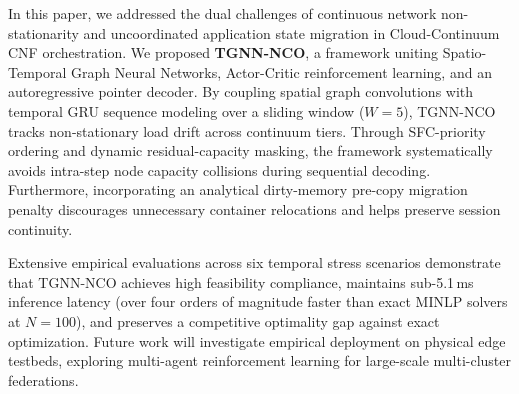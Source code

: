 \documentclass[conference]{IEEEtran}
\begin{document}
In this paper, we addressed the dual challenges of continuous network non-stationarity and uncoordinated application state migration in Cloud-Continuum CNF orchestration. We proposed \textbf{TGNN-NCO}, a framework uniting Spatio-Temporal Graph Neural Networks, Actor-Critic reinforcement learning, and an autoregressive pointer decoder. By coupling spatial graph convolutions with temporal GRU sequence modeling over a sliding window ($W=5$), TGNN-NCO tracks non-stationary load drift across continuum tiers. Through SFC-priority ordering and dynamic residual-capacity masking, the framework systematically avoids intra-step node capacity collisions during sequential decoding. Furthermore, incorporating an analytical dirty-memory pre-copy migration penalty discourages unnecessary container relocations and helps preserve session continuity.

Extensive empirical evaluations across six temporal stress scenarios demonstrate that TGNN-NCO achieves high feasibility compliance, maintains sub-5.1\,ms inference latency (over four orders of magnitude faster than exact MINLP solvers at $N=100$), and preserves a competitive optimality gap against exact optimization. Future work will investigate empirical deployment on physical edge testbeds, exploring multi-agent reinforcement learning for large-scale multi-cluster federations.


\balance


\end{document}
